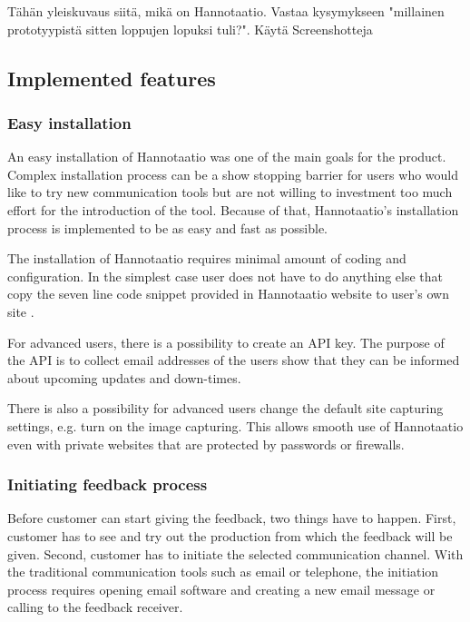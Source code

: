 \documentclass[english,12pt,a4paper,pdftex]{article}
\begin{document}
Tähän yleiskuvaus siitä, mikä on Hannotaatio. Vastaa kysymykseen "millainen prototyypistä sitten loppujen lopuksi tuli?". Käytä Screenshotteja

\subsection{Implemented features}

\subsubsection{Easy installation}

An easy installation of Hannotaatio was one of the main goals for the product. Complex installation process can be a show stopping barrier for users who would like to try new communication tools but are not willing to investment too much effort for the introduction of the tool. Because of that, Hannotaatio's installation process is implemented to be as easy and fast as possible.

The installation of Hannotaatio requires minimal amount of coding and configuration. In the simplest case user does not have to do anything else that copy the seven line code snippet provided in Hannotaatio website to user's own site \citep{hannotaatio}.

For advanced users, there is a possibility to create an API key. The purpose of the API is to collect email addresses of the users show that they can be informed about upcoming updates and down-times.

There is also a possibility for advanced users change the default site capturing settings, e.g. turn on the image capturing. This allows smooth use of Hannotaatio even with private websites that are protected by passwords or firewalls.

\subsubsection{Initiating feedback process}

Before customer can start giving the feedback, two things have to happen. First, customer has to see and try out the production from which the feedback will be given. Second, customer has to initiate the selected communication channel. With the traditional communication tools such as email or telephone, the initiation process requires opening email software and creating a new email message or calling to the feedback receiver.
\end{document}
